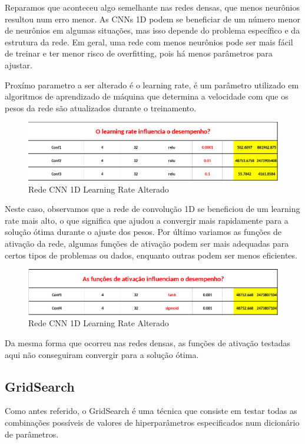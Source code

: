 \documentclass[10pt]{article}
\begin{document}
Reparamos que aconteceu algo semelhante nas redes densas, que menos neurônios
resultou num erro menor. As CNNs 1D podem se beneficiar de um número menor 
de neurônios em algumas situações, mas isso depende do problema específico 
e da estrutura da rede. Em geral, uma rede com menos neurônios pode ser mais 
fácil de treinar e ter menor risco de overfitting, pois há menos parâmetros 
para ajustar.

\vspace{1cm}
Proxímo parametro a ser alterado é o learning rate, é um parâmetro utilizado 
em algoritmos de aprendizado de máquina que determina a velocidade com que 
os pesos da rede são atualizados durante o treinamento.


\begin{figure}[htb]
  \centering
  \includegraphics[width=\linewidth]{img/cnn_lr.png}
  \caption{Rede CNN 1D Learning Rate Alterado}
  \label{fig:cnn_lr}
\end{figure}

Neste caso, observamos que a rede de convolução 1D se beneficiou de um 
learning rate mais alto, o que significa que ajudou a convergir mais 
rapidamente para a solução ótima durante o ajuste dos pesos.
\newpage
Por último variamos as funções de ativação da rede, algumas funções de 
ativação podem ser mais adequadas para certos tipos de problemas ou dados, 
enquanto outras podem ser menos eficientes.

\begin{figure}[htb]
  \centering
  \includegraphics[width=\linewidth]{img/cnn_ativacao.png}
  \caption{Rede CNN 1D Learning Rate Alterado}
  \label{fig:cnn_ativacao}
\end{figure}

Da mesma forma que ocorreu nas redes densas, as funções de ativação testadas aqui não 
conseguiram convergir para a solução ótima.

\subsection{GridSearch}
Como antes referido, o GridSearch é uma técnica que consiste em testar todas as combinações 
possíveis de valores de hiperparâmetros especificados num dicionário de parâmetros.
\end{document}
